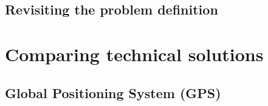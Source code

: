 
\subsection{Revisiting the problem definition}





\section{Comparing technical solutions}

\subsection{Global Positioning System (GPS)}
\label{sec:gps}

